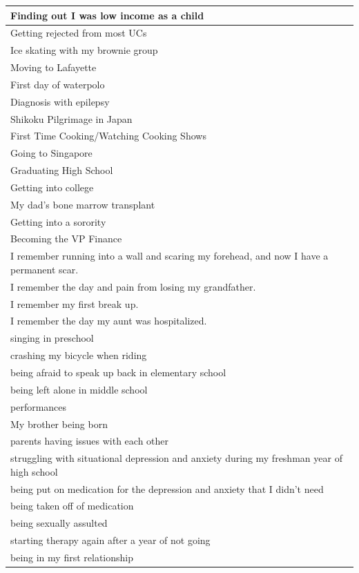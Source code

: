 \documentclass[
  .7em,
  letterpaper,
  DIV=11,
  numbers=noendperiod]{scrartcl}
\begin{document}
\begin{table}
\begin{tabular}{l}
\hline
Finding out I was low income as a child\\
\hline
Getting rejected from most UCs\\
\hline
Ice skating with my brownie group\\
\hline
Moving to Lafayette\\
\hline
First day of waterpolo\\
\hline
Diagnosis with epilepsy\\
\hline
Shikoku Pilgrimage in Japan\\
\hline
First Time Cooking/Watching Cooking Shows\\
\hline
Going to Singapore\\
\hline
Graduating High School\\
\hline
Getting into college\\
\hline
My dad's bone marrow transplant\\
\hline
Getting into a sorority\\
\hline
Becoming the VP Finance\\
\hline
I remember running into a wall and scaring my forehead, and now I have a permanent scar.\\
\hline
I remember the day and pain from losing my grandfather.\\
\hline
I remember my first break up.\\
\hline
I remember the day my aunt was hospitalized.\\
\hline
singing in preschool\\
\hline
crashing my bicycle when riding\\
\hline
being afraid to speak up back in elementary school\\
\hline
being left alone in middle school\\
\hline
performances\\
\hline
My brother being born\\
\hline
parents having issues with each other\\
\hline
struggling with situational depression and anxiety during my freshman year of high school\\
\hline
being put on medication for the depression and anxiety that I didn't need\\
\hline
being taken off of medication\\
\hline
being sexually assulted\\
\hline
starting therapy again after a year of not going\\
\hline
being in my first relationship\\

\end{tabular}
\end{table}
\end{document}
